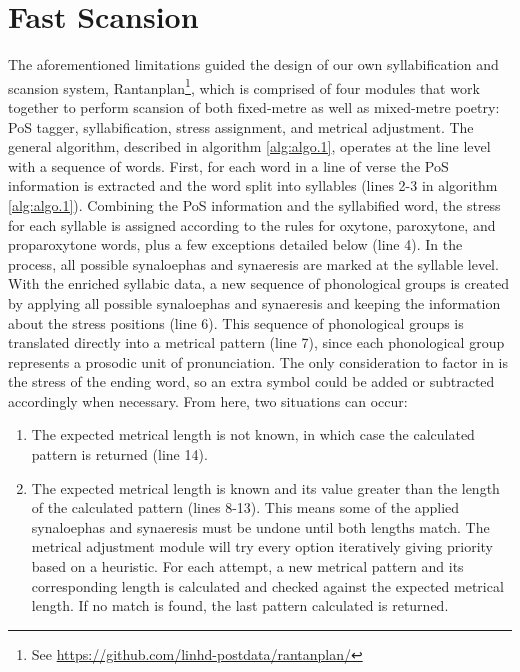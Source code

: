 \documentclass[a4paper,11pt,twocolumn,twoside]{article}
\begin{document}
\section{Fast Scansion}
The aforementioned limitations guided the design of our own syllabification and scansion system, Rantanplan\footnote{See \url{ https://github.com/linhd-postdata/rantanplan/}}, which is comprised of four modules that work together to perform scansion of both fixed-metre as well as mixed-metre poetry: PoS tagger, syllabification, stress assignment, and metrical adjustment. The general algorithm, described in algorithm \ref{alg:algo.1}, operates at the line level with a sequence of words. First, for each word in a line of verse the PoS information is extracted and the word split into syllables (lines 2-3 in algorithm \ref{alg:algo.1}). Combining the PoS information and the syllabified word, the stress for each syllable is assigned according to the rules for oxytone, paroxytone, and proparoxytone words, plus a few exceptions detailed below (line 4). In the process, all possible synaloephas and synaeresis are marked at the syllable level. With the enriched syllabic data, a new sequence of phonological groups is created by applying all possible synaloephas and synaeresis and keeping the information about the stress positions (line 6). This sequence of phonological groups is translated directly into a metrical pattern (line 7), since each phonological group represents a prosodic unit of pronunciation. The only consideration to factor in is the stress of the ending word, so an extra symbol could be added or subtracted accordingly when necessary. From here, two situations can occur:
\begin{enumerate}
\item The expected metrical length is not known, in which case the calculated pattern is returned (line 14).
\item The expected metrical length is known and its value greater than the length of the calculated pattern (lines 8-13). This means some of the applied synaloephas and synaeresis must be undone until both lengths match. The metrical adjustment module will try every option iteratively giving priority based on a heuristic. For each attempt, a new metrical pattern and its corresponding length is calculated and checked against the expected metrical length. If no match is found, the last pattern calculated is returned.
\end{enumerate}
\end{document}
